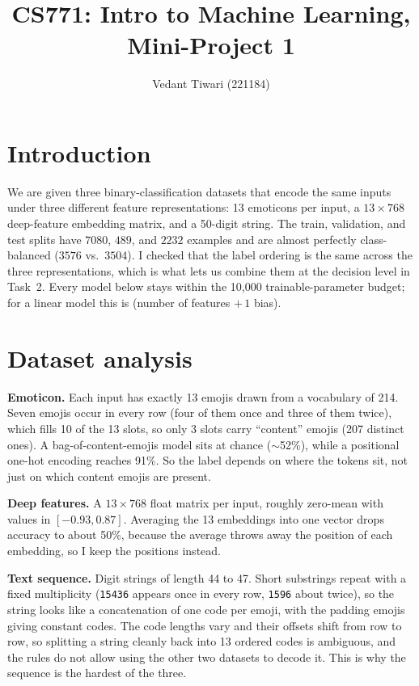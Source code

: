 \documentclass[10pt]{article}
\title{\vspace{-1.4cm}\textbf{CS771: Intro to Machine Learning, Mini-Project 1}}
\author{Vedant Tiwari (221184)}
\date{}
\begin{document}
\maketitle
\vspace{-0.6cm}

\section{Introduction}
We are given three binary-classification datasets that encode the same inputs under three different
feature representations: 13 emoticons per input, a $13\times768$ deep-feature embedding matrix, and a
50-digit string. The train, validation, and test splits have $7080$, $489$, and $2232$ examples and are
almost perfectly class-balanced ($3576$ vs.\ $3504$). I checked that the label ordering is the same across
the three representations, which is what lets us combine them at the decision level in Task~2. Every model
below stays within the 10{,}000 trainable-parameter budget; for a linear model this is (number of features
$+\,1$ bias).

\section{Dataset analysis}
\textbf{Emoticon.} Each input has exactly 13 emojis drawn from a vocabulary of 214. Seven emojis occur in
every row (four of them once and three of them twice), which fills 10 of the 13 slots, so only 3 slots carry
``content'' emojis (207 distinct ones). A bag-of-content-emojis model sits at chance ($\sim$52\%), while a
positional one-hot encoding reaches 91\%. So the label depends on where the tokens sit, not just on which
content emojis are present.

\textbf{Deep features.} A $13\times768$ float matrix per input, roughly zero-mean with values in
$[-0.93,0.87]$. Averaging the 13 embeddings into one vector drops accuracy to about 50\%, because the
average throws away the position of each embedding, so I keep the positions instead.

\textbf{Text sequence.} Digit strings of length 44 to 47. Short substrings repeat with a fixed multiplicity
(\texttt{15436} appears once in every row, \texttt{1596} about twice), so the string looks like a
concatenation of one code per emoji, with the padding emojis giving constant codes. The code lengths vary
and their offsets shift from row to row, so splitting a string cleanly back into 13 ordered codes is
ambiguous, and the rules do not allow using the other two datasets to decode it. This is why the sequence
is the hardest of the three.
\end{document}
